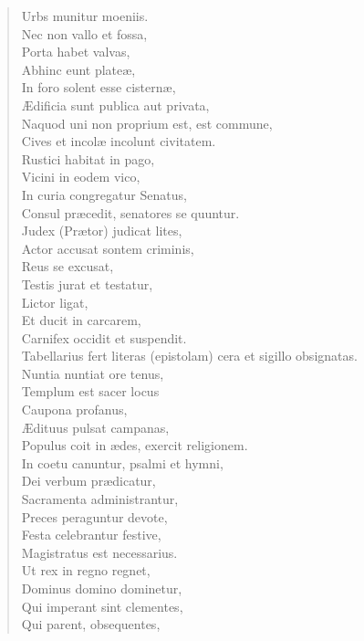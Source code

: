 \begin{verse}

  Urbs munitur moeniis.\\
  Nec non vallo et fossa,\\
  Porta habet valvas,\\
  Abhinc eunt plateæ,\\
  In foro solent esse cisternæ,\\
  Ædificia sunt publica aut privata,\\
  Naquod uni non proprium est, est commune,\\
  Cives et incolæ incolunt civitatem.\\
  Rustici habitat in pago,\\
  Vicini in eodem vico,\\
  In curia congregatur Senatus,\\
  Consul præcedit, senatores se quuntur.\\
  Judex (Prætor) judicat lites,\\
  Actor accusat sontem criminis,\\
  Reus se excusat,\\
  Testis jurat et testatur,\\
  Lictor ligat,\\
  Et ducit in carcarem,\\
  Carnifex occidit et suspendit.\\
  Tabellarius fert literas (epistolam) cera et sigillo obsignatas.\\
  Nuntia nuntiat ore tenus,\\
  Templum est sacer locus\\
  Caupona profanus,\\
  Ædituus pulsat campanas,\\
  Populus coit in ædes, exercit religionem.\\
  In coetu canuntur, psalmi et hymni,\\
  Dei verbum prædicatur,\\
  Sacramenta administrantur,\\
  Preces peraguntur devote,\\
  Festa celebrantur festive,\\
  Magistratus est necessarius.\\
  Ut rex in regno regnet,\\
  Dominus domino dominetur,\\
  Qui imperant sint clementes,\\
  Qui parent, obsequentes,\\

\end{verse}
